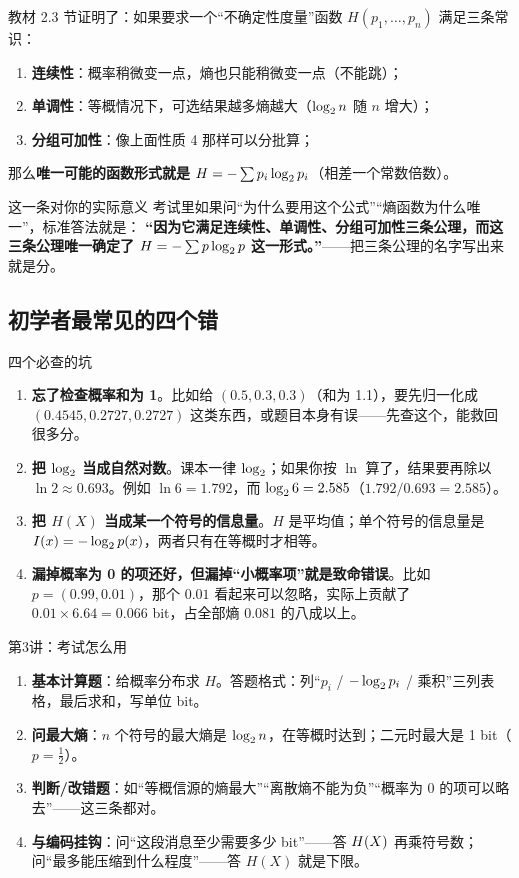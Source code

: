教材 2.3 节证明了：如果要求一个“不确定性度量”函数 $H(p_1,\dots,p_n)$ 满足三条常识：
\begin{enumerate}[leftmargin=1.6em,itemsep=1pt,topsep=2pt]
  \item \textbf{连续性}：概率稍微变一点，熵也只能稍微变一点（不能跳）；
  \item \textbf{单调性}：等概情况下，可选结果越多熵越大（$\log_{2} n$ 随 $n$ 增大）；
  \item \textbf{分组可加性}：像上面性质 4 那样可以分批算；
\end{enumerate}
那么\textbf{唯一可能的函数形式就是} $H=-\sum p_i\log_{2} p_i$（相差一个常数倍数）。

\begin{idea}{这一条对你的实际意义}
考试里如果问“为什么要用这个公式”“熵函数为什么唯一”，标准答法就是：
\textbf{“因为它满足连续性、单调性、分组可加性三条公理，而这三条公理唯一确定了 $H=-\sum p\log_{2} p$ 这一形式。”}——把三条公理的名字写出来就是分。
\end{idea}

\subsection{初学者最常见的四个错}

\begin{qa}{四个必查的坑}
\begin{enumerate}[leftmargin=1.6em,itemsep=1pt,topsep=2pt]
  \item \textbf{忘了检查概率和为 1}。比如给 $(0.5,0.3,0.3)$（和为 1.1），要先归一化成 $(0.4545,0.2727,0.2727)$ 这类东西，或题目本身有误——先查这个，能救回很多分。
  \item \textbf{把 $\log_{2}$ 当成自然对数}。课本一律 $\log_{2}$；如果你按 $\ln$ 算了，结果要再除以 $\ln2\approx0.693$。例如 $\ln6=1.792$，而 $\log_{2}6=2.585$（$1.792/0.693=2.585$）。
  \item \textbf{把 $H(X)$ 当成某一个符号的信息量}。$H$ 是平均值；单个符号的信息量是 $I(x)=-\log_{2} p(x)$，两者只有在等概时才相等。
  \item \textbf{漏掉概率为 0 的项还好，但漏掉“小概率项”就是致命错误}。比如 $p=(0.99,0.01)$，那个 $0.01$ 看起来可以忽略，实际上贡献了 $0.01\times6.64=0.066$ bit，占全部熵 $0.081$ 的八成以上。
\end{enumerate}
\end{qa}

\begin{exam}{第3讲：考试怎么用}
\begin{enumerate}[leftmargin=1.6em,itemsep=1pt,topsep=2pt]
  \item \textbf{基本计算题}：给概率分布求 $H$。答题格式：列“$p_i$ / $-\log_{2} p_i$ / 乘积”三列表格，最后求和，写单位 bit。
  \item \textbf{问最大熵}：$n$ 个符号的最大熵是 $\log_{2} n$，在等概时达到；二元时最大是 1 bit（$p=\frac12$）。
  \item \textbf{判断/改错题}：如“等概信源的熵最大”“离散熵不能为负”“概率为 0 的项可以略去”——这三条都对。
  \item \textbf{与编码挂钩}：问“这段消息至少需要多少 bit”——答 $H\!\left(X\right)$ 再乘符号数；问“最多能压缩到什么程度”——答 $H(X)$ 就是下限。
\end{enumerate}
\end{exam}

